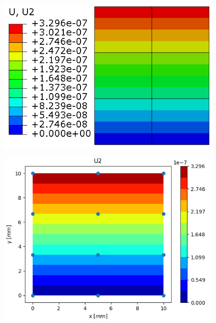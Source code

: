 \documentclass[11pt]{article}
\begin{document}
\begin{figure}[H]
	\centering
	\begin{minipage}{.5\textwidth}
		\centering
		\includegraphics[width=1\linewidth]{EME23U2.png}
		\label{EME23U2}
	\end{minipage}%
	\begin{minipage}{.5\textwidth}
		\centering
		\includegraphics[width=1\linewidth]{EME23U2_IGA.png}
		\label{EME23U2_IGA}
	\end{minipage}
\end{figure}
\end{document}
